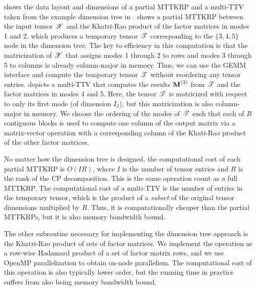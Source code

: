 shows the data layout and dimensions of a partial MTTKRP and a multi-TTV taken from the example dimension tree in .
 shows a partial MTTKRP between the input tensor $\T{X}$ and the Khatri-Rao product of the factor matrices in modes 1 and 2, which produces a temporary tensor $\T{T}$ corresponding to the $\{3,4,5\}$ node in the dimension tree.
The key to efficiency in this computation is that the matricization of $\T{X}$ that assigns modes 1 through 2 to rows and modes 3 through 5 to columns is already column-major in memory.
Thus, we can use the GEMM interface and compute the temporary tensor $\T{T}$ without reordering any tensor entries.
 depicts a multi-TTV that computes the results $\Mn{M}{3}$ from $\T{T}$ and the factor matrices in modes 4 and 5.
Here, the tensor $\T{T}$ is matricized with respect to only its first mode (of dimension $I_3$), but this matricization is also column-major in memory.
We choose the ordering of the modes of $\T{T}$ such that each of $R$ contiguous blocks is used to compute one column of the output matrix via a matrix-vector operation with a corresponding column of the Khati-Rao product of the other factor matrices.

No matter how the dimension tree is designed, the computational cost of each partial MTTKRP is $O(IR)$, where $I$ is the number of tensor entries and $R$ is the rank of the CP decomposition.
This is the same operation count as a full MTTKRP.
The computational cost of a multi-TTV is the number of entries in the temporary tensor, which is the product of a \emph{subset} of the original tensor dimensions multiplied by $R$.
Thus, it is computationally cheaper than the partial MTTKRPs, but it is also memory bandwidth bound.

The other subroutine necessary for implementing the dimension tree approach is the Khatri-Rao product of sets of factor matrices.
We implement the operation as a row-wise Hadamard product of a set of factor matrix rows, and we use OpenMP parallelization to obtain on-node parallelism.
The computational cost of this operation is also typically lower order, but the running time in practice suffers from also being memory bandwidth bound.

